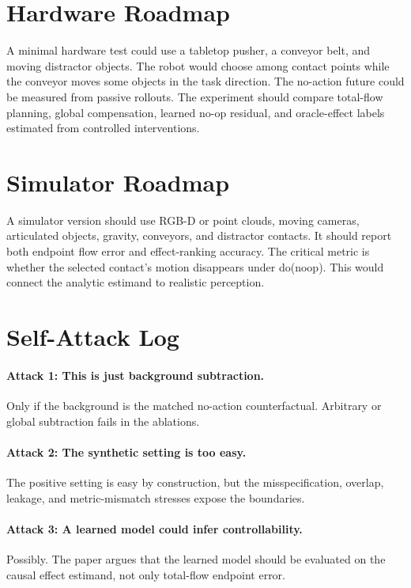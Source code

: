 \documentclass{article}
\begin{document}
\section{Hardware Roadmap}

A minimal hardware test could use a tabletop pusher, a conveyor belt, and moving
distractor objects.  The robot would choose among contact points while the conveyor moves
some objects in the task direction.  The no-action future could be measured from passive
rollouts.  The experiment should compare total-flow planning, global compensation,
learned no-op residual, and oracle-effect labels estimated from controlled interventions.

\section{Simulator Roadmap}

A simulator version should use RGB-D or point clouds, moving cameras, articulated
objects, gravity, conveyors, and distractor contacts.  It should report both endpoint
flow error and effect-ranking accuracy.  The critical metric is whether the selected
contact's motion disappears under do(noop).  This would connect the analytic estimand to
realistic perception.

\section{Self-Attack Log}

\paragraph{Attack 1: This is just background subtraction.}
Only if the background is the matched no-action counterfactual.  Arbitrary or global
subtraction fails in the ablations.

\paragraph{Attack 2: The synthetic setting is too easy.}
The positive setting is easy by construction, but the misspecification, overlap, leakage,
and metric-mismatch stresses expose the boundaries.

\paragraph{Attack 3: A learned model could infer controllability.}
Possibly.  The paper argues that the learned model should be evaluated on the causal
effect estimand, not only total-flow endpoint error.
\end{document}
